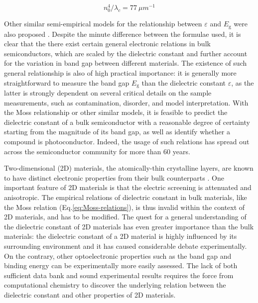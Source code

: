\documentclass[journal=ancac3,manuscript=article,email=true,hyperref=true,keywords=true]{achemso}
\begin{document}
\begin{equation}
\label{eq:Moss-wave}
n_{0}^{4} /\lambda_{c} = 77~ \mu m^{-1}
\end{equation}

Other similar
semi-empirical models for the relationship between \(\varepsilon\) and
\(E_{\mathrm{g}}\) were also proposed
\cite{Ravindra_1979_eps_Eg,Ravindra_1980_model,Ravindra_2007_Eg_rev}. 
Despite the minute difference between the formulae used, it is clear that the
there exist certain general electronic relations in bulk
semiconductors, which are scaled by the dielectric constant and further
account for the variation in band gap between different
materials. The existence of such general relationship is also of high
practical importance: it is generally more straightforward to measure
the band gap \(E_{\mathrm{g}}\) than the dielectric constant \(\varepsilon\),
as the latter is strongly dependent on several critical 
details on the sample measurements, such as contamination, disorder, 
and model interpretation. With the Moss
relationship or other similar models, it is feasible to predict the
dielectric constant of a bulk semiconductor with a reasonable degree
of certainty starting from the magnitude of its band gap, 
as well as identify whether a compound is photoconductor. 
Indeed, the usage of such relations has spread out across 
the semiconductor community for more than 60 years. 

Two-dimensional (2D) materials, the atomically-thin crystalline
layers, are known to have distinct electronic properties from their
bulk counterparts
\cite{Ando_1982_electron_2D,Stern_1967_polarizability_2DEG}. One
important feature of 2D materials is that the electric screening is
attenuated and anisotropic\cite{Das-Sarma:2011aa,Ando_1982_electron_2D}. 
The empirical
relations of dielectric constant in bulk materials, like the Moss
relation (Eq.\ref{eq:Moss-relations}), is thus invalid within the context of 2D materials, and has
to be modified. The quest for a general understanding of the
dielectric constant of 2D materials has even greater importance than
the bulk materials: the dielectric constant of a 2D material is
highly influenced by its surrounding environment
\cite{Keldysh_1979_eps_multi,Trolle_2017_eps_subst} and it has caused
considerable debate experimentally\cite{Raja:2017aa,Chernikov_2014_EB_MoS2_2D3D}. 
On the contrary, other
optoelectronic properties such as the band gap and binding energy can
be experimentally more easily assessed. 
The lack of both sufficient
data bank and sound experimental results requires the force from
computational chemistry to discover the underlying relation between
the dielectric constant and other properties of 2D materials. 
\end{document}
